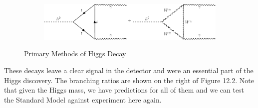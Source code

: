 \documentclass[a4paper, 11pt, normalem]{report}
\begin{document}
\begin{figure}[H]
\begin{subfigure}[c]{0.3\textwidth}
    \end{subfigure}\\
    \begin{subfigure}[c]{0.7\textwidth}
        \includegraphics[width=\textwidth]{higgs7.pdf}
    \end{subfigure}
    \caption{Primary Methods of Higgs Decay}
\end{figure}
These decays leave a clear signal in the detector and were an essential part of the Higgs discovery.
The branching ratios are shown on the right of Figure 12.2.
Note that given the Higgs mass, we have predictions for all of them and we can test the Standard Model against experiment here again.
\end{document}
